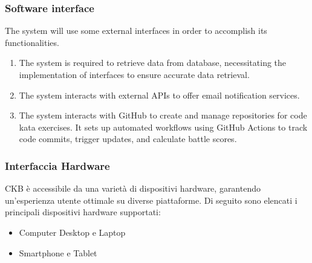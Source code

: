 \subsubsection{Software interface}
The system will use some  external interfaces in order to accomplish its functionalities.
\begin{enumerate}
    \item The system is required to retrieve data from  database, necessitating the implementation of  interfaces to ensure accurate data retrieval.
    \item The system interacts with external APIs to offer email notification services.
    \item The system interacts with GitHub to create and manage repositories for code kata exercises. It sets up automated workflows using GitHub Actions to track code commits, trigger updates, and calculate battle scores.
\end{enumerate}
\subsubsection{Interfaccia Hardware}

CKB è accessibile da una varietà di dispositivi hardware, garantendo un'esperienza utente ottimale su diverse piattaforme. Di seguito sono elencati i principali dispositivi hardware supportati:

\begin{itemize}
    \item Computer Desktop e Laptop

    \item Smartphone e Tablet 

\end{itemize}






